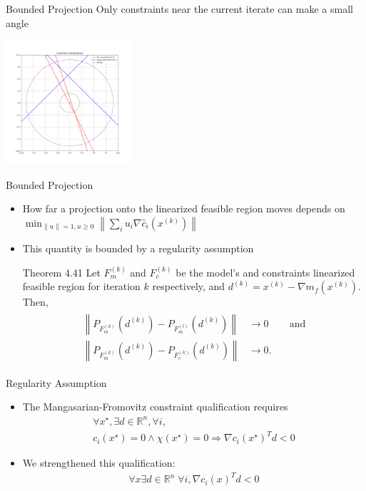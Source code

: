 \documentclass{beamer}
\newcommand{\Rn}{\mathbb R ^ {n}}
\newcommand{\xk}{{{x}^{(k)}}}
\newcommand{\neggrad}{d^{(k)}}
\begin{document}
\begin{frame}{Bounded Projection}
	Only constraints near the current iterate can make a small angle
	\begin{center}
		\includegraphics[width=175px]{images/classification.png}
	\end{center}
\end{frame}


\begin{frame}{Bounded Projection}
	\begin{itemize}
		\item How far a projection onto the linearized feasible region moves depends on
		$
			\min_{\|u\| = 1, u \ge 0} \left\|\sum_{i} u_i \nabla \hat c_i\left(\xk\right)\right\|
		$
		\item This quantity is bounded by a regularity assumption
		\begin{block}{Theorem 4.41}
			Let $F_m^{(k)}$ and $F_c^{(k)}$ be the model's and constraints linearized feasible region for iteration $k$ respectively,
			and $\neggrad = \xk - \nabla m_f\left(\xk\right)$. Then,
			\begin{align*}
				\begin{array}{ccc}
					\left\|P_{F_m^{(k)}}\left(\neggrad\right)
					-  P_{F_m^{(l)}}\left(\neggrad\right)\right\| & \to 0 & \quad \textrm{and} \\
					\left\|P_{F_m^{(k)}}\left(\neggrad\right)
					-  P_{F_c^{(k)}}\left(\neggrad\right)\right\| & \to 0. &
				\end{array}
			\end{align*}
		\end{block}
	\end{itemize}
\end{frame}



\begin{frame}{Regularity Assumption}
\begin{itemize}
\item The Mangasarian-Fromovitz constraint qualification requires
\begin{align*}
\forall x^{\star}, \exists d \in \Rn, \forall i, \\
c_i\left(x^{\star}\right)=0 \wedge \chi\left(x^{\star}\right) = 0 \Longrightarrow \nabla c_i\left(x^{\star}\right)^T d < 0 
\end{align*}
\item We strengthened this qualification:
\begin{align*}
\forall x \exists d \in \Rn\; \forall i, \nabla c_i\left(x\right)^T d < 0
\end{align*}
\end{itemize}
\end{frame}
\end{document}
